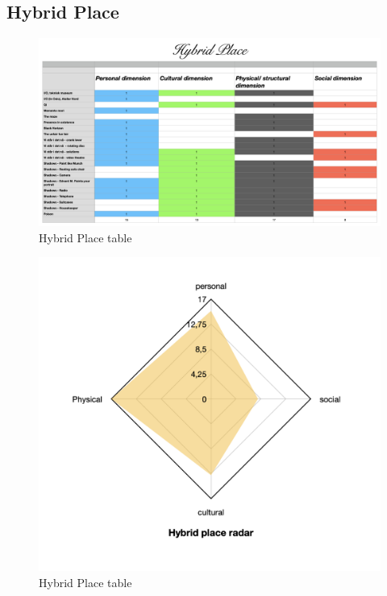 \subsection{Hybrid Place}
\begin{figure}[H]
\includegraphics[width=20cm, angle=90]{pictures/analysis/hybrid.png}
\caption{Hybrid Place table}
\centering 
\end{figure}

\begin{figure}[H]
\includegraphics[width=12.5cm]{pictures/analysis/hybrid_radar.png}
\caption{Hybrid Place table}
\centering 
\end{figure}


